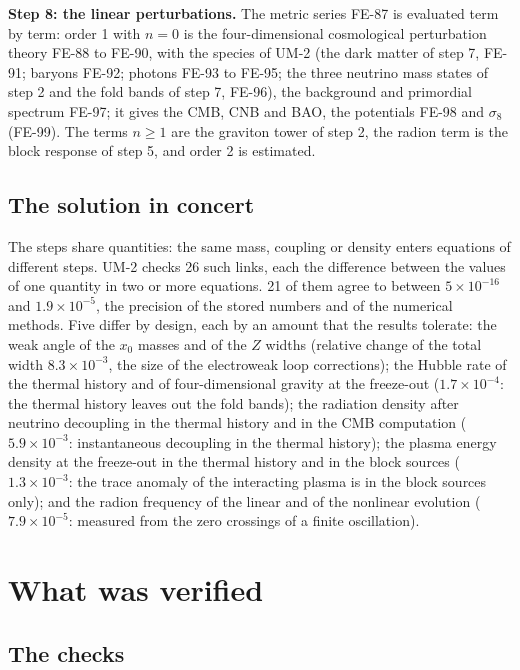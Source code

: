\documentclass[
  10pt,
]{article}
\begin{document}
\textbf{Step 8: the linear perturbations.} The metric series FE-87 is
evaluated term by term: order 1 with \(n = 0\) is the four-dimensional
cosmological perturbation theory FE-88 to FE-90, with the species of
UM-2 (the dark matter of step 7, FE-91; baryons FE-92; photons FE-93 to
FE-95; the three neutrino mass states of step 2 and the fold bands of
step 7, FE-96), the background and primordial spectrum FE-97; it gives
the CMB, CNB and BAO, the potentials FE-98 and \(\sigma_8\) (FE-99). The
terms \(n \ge 1\) are the graviton tower of step 2, the radion term is
the block response of step 5, and order 2 is estimated.

\hypertarget{the-solution-in-concert}{%
\subsection{The solution in concert}\label{the-solution-in-concert}}

The steps share quantities: the same mass, coupling or density enters
equations of different steps. UM-2 checks 26 such links, each the
difference between the values of one quantity in two or more equations.
21 of them agree to between \(5\times10^{-16}\) and
\(1.9\times10^{-5}\), the precision of the stored numbers and of the
numerical methods. Five differ by design, each by an amount that the
results tolerate: the weak angle of the \(x_0\) masses and of the \(Z\)
widths (relative change of the total width \(8.3\times10^{-3}\), the
size of the electroweak loop corrections); the Hubble rate of the
thermal history and of four-dimensional gravity at the freeze-out
(\(1.7\times10^{-4}\): the thermal history leaves out the fold bands);
the radiation density after neutrino decoupling in the thermal history
and in the CMB computation (\(5.9\times10^{-3}\): instantaneous
decoupling in the thermal history); the plasma energy density at the
freeze-out in the thermal history and in the block sources
(\(1.3\times10^{-3}\): the trace anomaly of the interacting plasma is in
the block sources only); and the radion frequency of the linear and of
the nonlinear evolution (\(7.9\times10^{-5}\): measured from the zero
crossings of a finite oscillation).

\hypertarget{what-was-verified}{%
\section{What was verified}\label{what-was-verified}}

\hypertarget{the-checks}{%
\subsection{The checks}\label{the-checks}}
\end{document}
